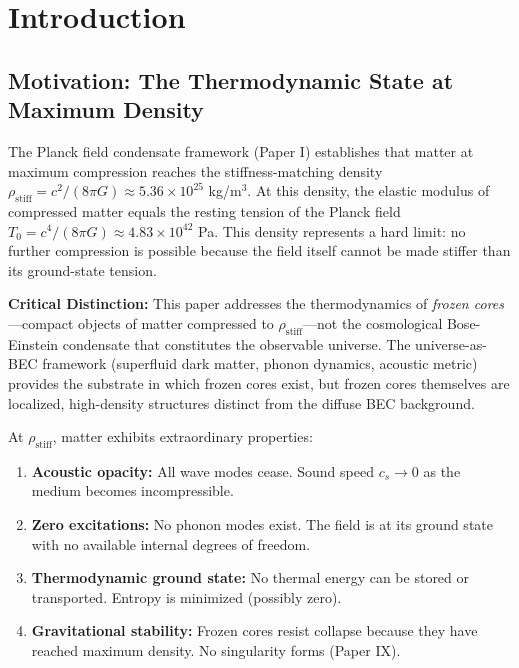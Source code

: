 \documentclass[11pt,a4paper]{article}
\newcommand{\rhostiff}{\ensuremath{\rho_{\mathrm{stiff}}}}
\newcommand{\Tzero}{\ensuremath{T_0}}
\newcommand{\cs}{\ensuremath{c_s}}
\theoremstyle{definition}
\theoremstyle{remark}
\begin{document}
\begin{abstract}
\vspace{0.5em}
\noindent
\textbf{Keywords:} Planck field, frozen cores, thermodynamics, absolute zero, phonon dynamics, thermal thaw, dark matter stars, Hawking radiation, resting tension, acoustic black holes
\end{abstract}

\tableofcontents
\newpage

\section{Introduction}
\label{sec:introduction}

\subsection{Motivation: The Thermodynamic State at Maximum Density}
\label{sec:motivation}

The Planck field condensate framework (Paper I) establishes that matter at maximum compression reaches the stiffness-matching density $\rhostiff = c^2/(8\pi G) \approx 5.36 \times 10^{25}$ kg/m$^3$. At this density, the elastic modulus of compressed matter equals the resting tension of the Planck field $\Tzero = c^4/(8\pi G) \approx 4.83 \times 10^{42}$ Pa. This density represents a hard limit: no further compression is possible because the field itself cannot be made stiffer than its ground-state tension.

\vspace{0.5em}
\noindent
\textbf{Critical Distinction:} This paper addresses the thermodynamics of \emph{frozen cores}---compact objects of matter compressed to $\rhostiff$---not the cosmological Bose-Einstein condensate that constitutes the observable universe. The universe-as-BEC framework (superfluid dark matter, phonon dynamics, acoustic metric) provides the substrate in which frozen cores exist, but frozen cores themselves are localized, high-density structures distinct from the diffuse BEC background.

\vspace{0.5em}
\noindent
At $\rhostiff$, matter exhibits extraordinary properties:
\begin{enumerate}[leftmargin=*, itemsep=0.3em]
\item \textbf{Acoustic opacity:} All wave modes cease. Sound speed $\cs \to 0$ as the medium becomes incompressible.
\item \textbf{Zero excitations:} No phonon modes exist. The field is at its ground state with no available internal degrees of freedom.
\item \textbf{Thermodynamic ground state:} No thermal energy can be stored or transported. Entropy is minimized (possibly zero).
\item \textbf{Gravitational stability:} Frozen cores resist collapse because they have reached maximum density. No singularity forms (Paper IX).
\end{enumerate}
\end{document}
